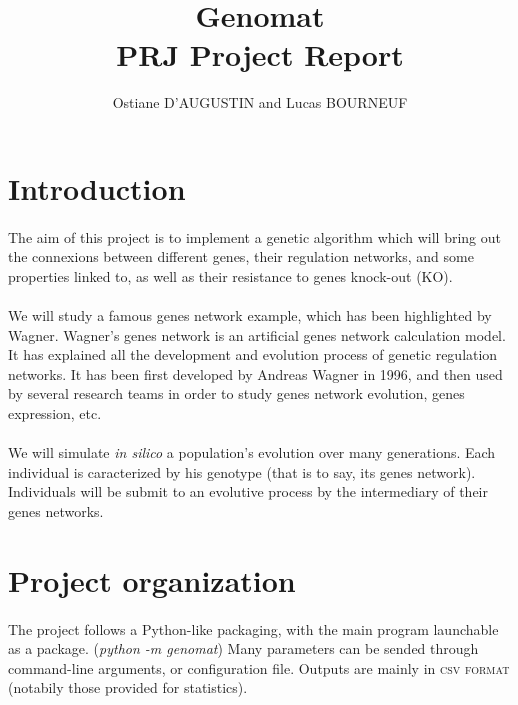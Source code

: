 \documentclass[]{report} %
\title{Genomat\\PRJ Project Report}
\author{Ostiane D'AUGUSTIN and Lucas BOURNEUF}
\date{}
\begin{document}
        \maketitle %




\section*{Introduction}
	\paragraph*{}
	The aim of this project is to implement a genetic algorithm which will bring out the connexions between different genes, 
        their regulation networks, and some properties linked to, as well as their resistance to genes knock-out (KO).
	\paragraph*{}
	We will study a famous genes network example, which has been highlighted by Wagner. Wagner's genes network is an artificial genes network calculation model. 
        It has explained all the development and evolution process of genetic regulation networks. It has been first developed by Andreas Wagner in 1996, 
        and then used by several research teams in order to study genes network evolution, genes expression, etc.
	\paragraph*{}
	We will simulate \textit{in silico} a population's evolution over many generations. Each individual is caracterized by his genotype 
        (that is to say, its genes network). 
        Individuals will be submit to an evolutive process by the intermediary of their genes networks.




\section*{Project organization}
	\paragraph*{}
        The project follows a Python-like packaging, with the main program launchable as a package. (\textit{python -m genomat})
        Many parameters can be sended through command-line arguments, or configuration file.
        Outputs are mainly in \textsc{csv format} (notabily those provided for statistics).
\end{document}
